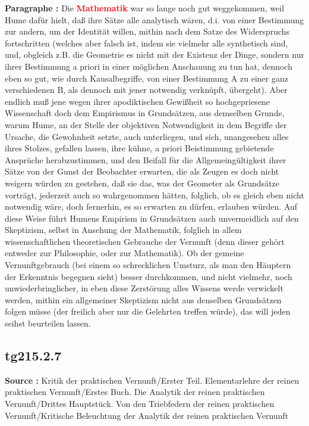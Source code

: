 \documentclass[a4paper,12pt,twoside]{book}
\newcommand{\match}[1]{\textcolor{red}{\textbf{#1}}}
\begin{document}
	\noindent\textbf{Paragraphe : }Die \match{Mathematik} war so lange noch gut weggekommen, weil Hume dafür hielt, daß ihre Sätze alle analytisch wären, d.i. von einer Bestimmung zur andern, um der Identität willen, mithin nach dem Satze des Widerspruchs fortschritten (welches aber falsch ist, indem sie vielmehr alle synthetisch sind, und, obgleich z.B. die Geometrie es nicht mit der Existenz der Dinge, sondern nur ihrer Bestimmung a priori in einer möglichen Anschauung zu tun hat, dennoch eben so gut, wie durch Kausalbegriffe, von einer Bestimmung A zu einer ganz verschiedenen B, als dennoch mit jener notwendig verknüpft, übergeht). Aber endlich muß jene wegen ihrer apodiktischen Gewißheit so hochgepriesene Wissenschaft doch dem Empirismus in Grundsätzen, aus demselben Grunde, warum Hume, an der Stelle der objektiven Notwendigkeit in dem Begriffe der Ursache, die Gewohnheit setzte, auch unterliegen, und sich, unangesehen alles ihres Stolzes, gefallen lassen, ihre kühne, a priori Beistimmung gebietende Ansprüche herabzustimmen, und den Beifall für die Allgemeingültigkeit ihrer Sätze von der Gunst der Beobachter erwarten, die als Zeugen es doch nicht weigern würden zu gestehen, daß sie das, was der Geometer als Grundsätze vorträgt, jederzeit auch so wahrgenommen hätten,  folglich, ob es gleich eben nicht notwendig wäre, doch fernerhin, es so erwarten zu dürfen, erlauben würden. Auf diese Weise führt Humens Empirism in Grundsätzen auch unvermeidlich auf den Skeptizism, selbst in Ansehung der Mathematik, folglich in allem wissenschaftlichen theoretischen Gebrauche der Vernunft (denn dieser gehört entweder zur Philosophie, oder zur Mathematik). Ob der gemeine Vernunftgebrauch (bei einem so schrecklichen Umsturz, als man den Häuptern der Erkenntnis begegnen sieht) besser durchkommen, und nicht vielmehr, noch unwiederbringlicher, in eben diese Zerstörung alles Wissens werde verwickelt werden, mithin ein allgemeiner Skeptizism nicht aus denselben Grundsätzen folgen müsse (der freilich aber nur die Gelehrten treffen würde), das will jeden seihst beurteilen lassen. 
	
	\subsection*{tg215.2.7} 
	\textbf{Source : }Kritik der praktischen Vernunft/Erster Teil. Elementarlehre der reinen praktischen Vernunft/Erstes Buch. Die Analytik der reinen praktischen Vernunft/Drittes Hauptstück. Von den Triebfedern der reinen praktischen Vernunft/Kritische Beleuchtung der Analytik der reinen praktischen Vernunft\\  
	
\end{document}

